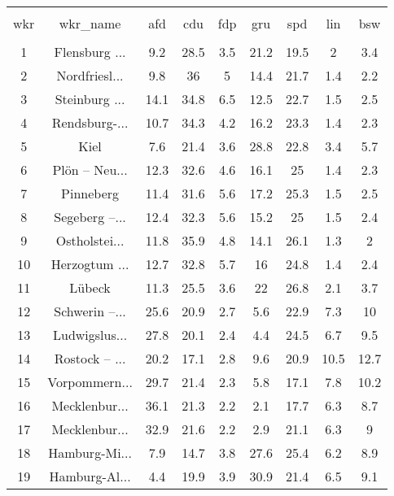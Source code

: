 
\begin{table}[!htbp] \centering 
  \caption{} 
  \label{} 
\begin{tabular}{@{\extracolsep{5pt}} ccccccccc} 
\\[-1.8ex]\hline 
\hline \\[-1.8ex] 
wkr & wkr\_name & afd & cdu & fdp & gru & spd & lin & bsw \\ 
\hline \\[-1.8ex] 
1 & Flensburg ... & 9.2 & 28.5 & 3.5 & 21.2 & 19.5 & 2 & 3.4 \\ 
2 & Nordfriesl... & 9.8 & 36 & 5 & 14.4 & 21.7 & 1.4 & 2.2 \\ 
3 & Steinburg ... & 14.1 & 34.8 & 6.5 & 12.5 & 22.7 & 1.5 & 2.5 \\ 
4 & Rendsburg-... & 10.7 & 34.3 & 4.2 & 16.2 & 23.3 & 1.4 & 2.3 \\ 
5 & Kiel & 7.6 & 21.4 & 3.6 & 28.8 & 22.8 & 3.4 & 5.7 \\ 
6 & Plön – Neu... & 12.3 & 32.6 & 4.6 & 16.1 & 25 & 1.4 & 2.3 \\ 
7 & Pinneberg & 11.4 & 31.6 & 5.6 & 17.2 & 25.3 & 1.5 & 2.5 \\ 
8 & Segeberg –... & 12.4 & 32.3 & 5.6 & 15.2 & 25 & 1.5 & 2.4 \\ 
9 & Ostholstei... & 11.8 & 35.9 & 4.8 & 14.1 & 26.1 & 1.3 & 2 \\ 
10 & Herzogtum ... & 12.7 & 32.8 & 5.7 & 16 & 24.8 & 1.4 & 2.4 \\ 
11 & Lübeck & 11.3 & 25.5 & 3.6 & 22 & 26.8 & 2.1 & 3.7 \\ 
12 & Schwerin –... & 25.6 & 20.9 & 2.7 & 5.6 & 22.9 & 7.3 & 10 \\ 
13 & Ludwigslus... & 27.8 & 20.1 & 2.4 & 4.4 & 24.5 & 6.7 & 9.5 \\ 
14 & Rostock – ... & 20.2 & 17.1 & 2.8 & 9.6 & 20.9 & 10.5 & 12.7 \\ 
15 & Vorpommern... & 29.7 & 21.4 & 2.3 & 5.8 & 17.1 & 7.8 & 10.2 \\ 
16 & Mecklenbur... & 36.1 & 21.3 & 2.2 & 2.1 & 17.7 & 6.3 & 8.7 \\ 
17 & Mecklenbur... & 32.9 & 21.6 & 2.2 & 2.9 & 21.1 & 6.3 & 9 \\ 
18 & Hamburg-Mi... & 7.9 & 14.7 & 3.8 & 27.6 & 25.4 & 6.2 & 8.9 \\ 
19 & Hamburg-Al... & 4.4 & 19.9 & 3.9 & 30.9 & 21.4 & 6.5 & 9.1 \\ 

\end{tabular}
\end{table}
